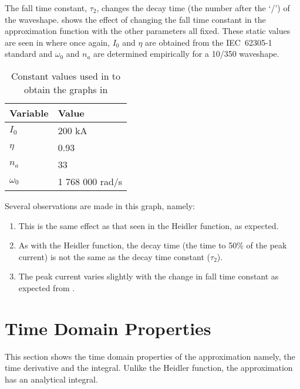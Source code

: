 The fall time constant, $\tau_2$, changes the decay time (the number after the `/') of the waveshape.  shows the effect of changing the fall time constant in the approximation function with the other parameters all fixed. These static values are seen in  where once again, $I_0$ and $\eta$ are obtained from the IEC~62305-1 standard and $\omega_0$ and $n_a$ are determined empirically for a 10/350 waveshape.
\begin{table}[htbp]
    \centering
    \caption{Constant values used in  to obtain the graphs in }
    \begin{tabular}{ll}
        \textbf{Variable} & \textbf{Value} \\
        \hline
        $I_0$ & 200 kA \\
        $\eta$ & 0.93 \\
        $n_a$ & 33 \\
        $\omega_0$ & 1 768 000 rad/s
    \end{tabular}
    \label{tab:approxConstsFall}
\end{table}

Several observations are made in this graph, namely:
\begin{enumerate}
    \item This is the same effect as that seen in the Heidler function, as expected.
    \item As with the Heidler function, the decay time (the time to 50\% of the peak current) is not the same as the decay time constant ($\tau_2$).
    \item The peak current varies slightly with the change in fall time constant as expected from .
\end{enumerate}


\section{Time Domain Properties}
\label{sec:approx_time_domain_analysis}
This section shows the time domain properties of the approximation namely, the time derivative and the integral. Unlike the Heidler function, the approximation has an analytical integral.

